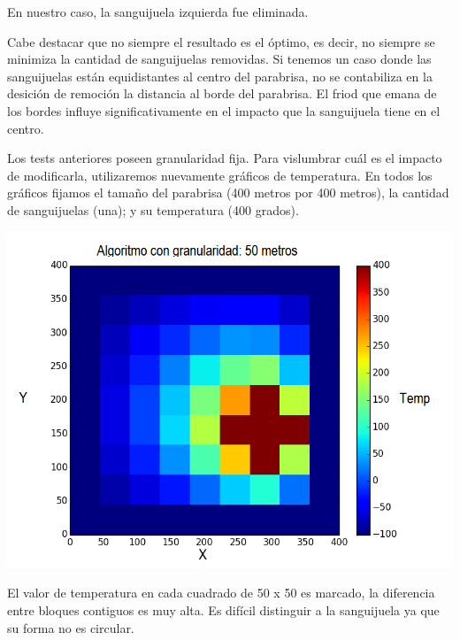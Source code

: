 	En nuestro caso, la sanguijuela izquierda fue eliminada.

	Cabe destacar que no siempre el resultado es el óptimo, es decir, no siempre se minimiza la cantidad de sanguijuelas removidas. Si tenemos un caso donde las sanguijuelas están equidistantes al centro del parabrisa, no se contabiliza en la desición de remoción la distancia al borde del parabrisa. El friod que emana de los bordes influye significativamente en el impacto que la sanguijuela tiene en el centro.

	Los tests anteriores poseen granularidad fija. Para vislumbrar cuál es el impacto de modificarla, utilizaremos nuevamente gráficos de temperatura. En todos los gráficos fijamos el tamaño del parabrisa (400 metros por 400 metros), la cantidad de sanguijuelas (una); y su temperatura (400 grados).

	\begin{center}
		\includegraphics[scale=0.5]{./img/granularidad/g50_t400_sinkill.png}
	\end{center}

	El valor de temperatura en cada cuadrado de 50 x 50 es marcado, la diferencia entre bloques contiguos es muy alta. Es difícil distinguir a la sanguijuela ya que su forma no es circular.

